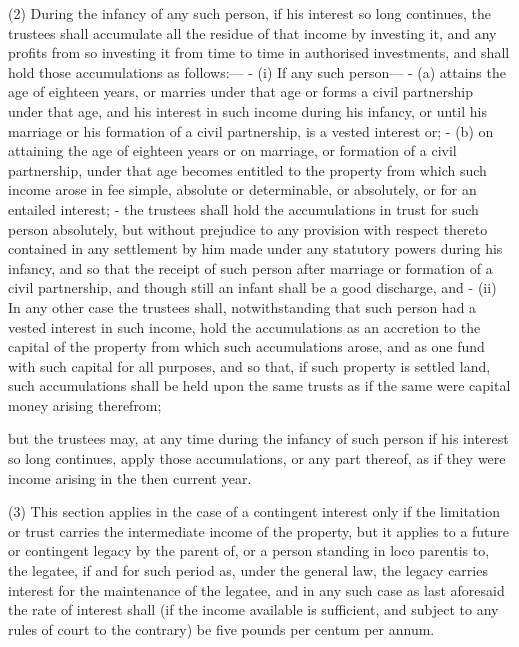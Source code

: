 \documentclass[
]{article}
\newenvironment{Shaded}{}{}
\newcommand{\NormalTok}[1]{#1}
\begin{document}
\begin{Shaded}
\begin{Highlighting}[]
\NormalTok{(2) During the infancy of any such person, if his interest so long continues, the trustees shall accumulate all the residue of that income by investing it, and any profits from so investing it from time to time in authorised investments, and shall hold those accumulations as follows:—}
\NormalTok{{-} (i) If any such person—}
\NormalTok{    {-} (a) attains the age of eighteen years, or marries under that age or forms a civil partnership under that age, and his interest in such income during his infancy, or until his marriage or his formation of a civil partnership, is a vested interest or;}
\NormalTok{    {-} (b) on attaining the age of eighteen years or on marriage, or formation of a civil partnership, under that age becomes entitled to the property from which such income arose in fee simple, absolute or determinable, or absolutely, or for an entailed interest;}
\NormalTok{{-} the trustees shall hold the accumulations in trust for such person absolutely, but without prejudice to any provision with respect thereto contained in any settlement by him made under any statutory powers during his infancy, and so that the receipt of such person after marriage or formation of a civil partnership, and though still an infant shall be a good discharge, and}
\NormalTok{{-} (ii) In any other case the trustees shall, notwithstanding that such person had a vested interest in such income, hold the accumulations as an accretion to the capital of the property from which such accumulations arose, and as one fund with such capital for all purposes, and so that, if such property is settled land, such accumulations shall be held upon the same trusts as if the same were capital money arising therefrom;}

\NormalTok{but the trustees may, at any time during the infancy of such person if his interest so long continues, apply those accumulations, or any part thereof, as if they were income arising in the then current year.}

\NormalTok{(3) This section applies in the case of a contingent interest only if the limitation or trust carries the intermediate income of the property, but it applies to a future or contingent legacy by the parent of, or a person standing in loco parentis to, the legatee, if and for such period as, under the general law, the legacy carries interest for the maintenance of the legatee, and in any such case as last aforesaid the rate of interest shall (if the income available is sufficient, and subject to any rules of court to the contrary) be five pounds per centum per annum.}


\end{Highlighting}
\end{Shaded}
\end{document}
